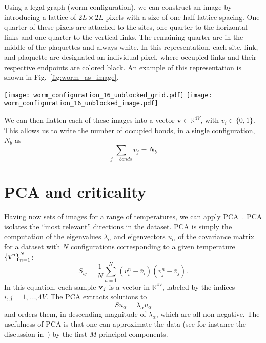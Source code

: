 \documentclass[../main.tex]{subfiles}
\begin{document}
Using a legal graph (worm configuration), we can construct an image by
introducing a lattice of $2L\times2L$  pixels with a size of one half lattice
spacing.  One quarter of these pixels are attached to the sites, one quarter to
the horizontal links and one quarter to the vertical links. The remaining
quarter are in the middle of the plaquettes and always white.  In this
representation, each site, link, and plaquette are designated an individual
pixel, where occupied links and their respective endpoints are colored black.
An example of this representation is shown in
Fig.~\ref{fig:worm_as_image}.
%
\begin{figure*}[htpb]
 \centering
 \texttt{[image: worm\_configuration\_16\_unblocked\_grid.pdf]}
 \hfill
 \texttt{[image: worm\_configuration\_16\_unblocked\_image.pdf]}
 \caption{(a) Legal worm configuration on an $L \times L$ lattice with periodic
		boundary conditions and; (b) its equivalent representation as a
		$2L\times2L$ black and white pixel image.}%
 \label{fig:worm_as_image}
\end{figure*}
%
We can then flatten each of these images into a vector $\mathbf{v} \in
\mathbb{R}^{4V}$, with $v_i \in \{0, 1\}$.
%
This allows us to write the number of occupied bonds, in a single
configuration, $N_b$ as
%
\begin{equation}
    \sum_{j = bonds} v_j = N_b
    \label{eq:link_sum}
\end{equation}
%
\section{PCA and criticality}%
\label{sec:pca}
Having now sets of images for a range of temperatures, we can apply
PCA~\cite{Bishop}.
%
PCA isolates the ``most relevant'' directions in the dataset.
%
PCA is simply the computation of the eigenvalues $\lambda_\alpha$ and
eigenvectors $u_\alpha$ of the covariance matrix for a dataset with $N$
configurations corresponding to a given temperature ${\{{\bf v}^n\}}_{n=1}^N$:
%
\begin{equation}
S_{ij} = \frac{1}{N} \sum_{n=1}^N (v_{i}^n - {\bar v}_i)
(v_{j}^n - {\bar v}_j).
\end{equation}
%
In this equation, each sample ${\bf v}_j$ is a vector in $\mathbb{R}^{4V}$,
labeled by the indices $i,j = 1,\ldots,4V$.
%
The PCA extracts solutions to
%
\begin{equation}
S u_\alpha = \lambda_\alpha u_\alpha
\end{equation}
%
and orders them, in descending magnitude of $\lambda_\alpha$, which are all
non-negative.
%
The usefulness of PCA is that one can approximate the data (see for instance
the discussion in~\cite{Bishop}) by the first $M$ principal components. 
\end{document}
